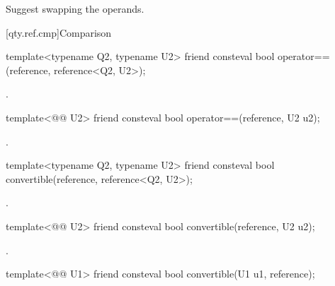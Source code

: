 \begin{itemdescr}
\pnum
\recommended
Suggest swapping the operands.
\end{itemdescr}

[qty.ref.cmp]{Comparison}

\begin{itemdecl}
template<typename Q2, typename U2>
friend consteval bool operator==(reference, reference<Q2, U2>);
\end{itemdecl}

\begin{itemdescr}
\pnum
\returns
{}.
\end{itemdescr}

\begin{itemdecl}
template<@@ U2>
friend consteval bool operator==(reference, U2 u2);
\end{itemdecl}

\begin{itemdescr}
\pnum
\returns
{}.
\end{itemdescr}

\begin{itemdecl}
template<typename Q2, typename U2>
friend consteval bool convertible(reference, reference<Q2, U2>);
\end{itemdecl}

\begin{itemdescr}
\pnum
\returns
{}.
\end{itemdescr}

\begin{itemdecl}
template<@@ U2>
friend consteval bool convertible(reference, U2 u2);
\end{itemdecl}

\begin{itemdescr}
\pnum
\returns
{}.
\end{itemdescr}

\begin{itemdecl}
template<@@ U1>
friend consteval bool convertible(U1 u1, reference);
\end{itemdecl}

